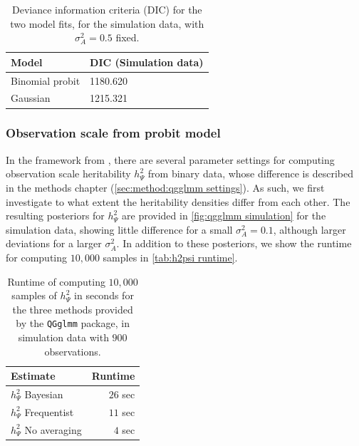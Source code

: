 \begin{table}
    \centering
    \begin{tabular}{@{}ll@{}}
    \toprule
        Model           & DIC (Simulation data) \\ \midrule
        Binomial probit & 1180.620 \\
        Gaussian        & 1215.321\\
        \bottomrule
    \end{tabular}
    \caption[DIC for simulation data]{Deviance information criteria (DIC) for the two model fits, for the simulation data, with $\sigma^2_A=0.5$ fixed.}
    \label{tab:simulation DICs}
\end{table}

\subsubsection{Observation scale from probit model}
In the framework from \textcite{de2016general}, there are several parameter settings for computing observation scale heritability $h^2_\Psi$ from binary data, whose difference is described in the methods chapter (\autoref{sec:method:qgglmm settings}). As such, we first investigate to what extent the heritability densities differ from each other. The resulting posteriors for $h^2_\Psi$ are provided in \autoref{fig:qgglmm simulation} for the simulation data, showing little difference for a small $\sigma^2_A=0.1$, although larger deviations for a larger $\sigma^2_A$. In addition to these posteriors, we show the runtime for computing $10,000$ samples in \autoref{tab:h2psi runtime}.

\begin{table}
    \centering
    \begin{tabular}{@{}lr@{}}
    \toprule
    Estimate & Runtime \\ \midrule
    $h^2_\Psi$ Bayesian & $26$ sec \\
    $h^2_\Psi$ Frequentist & $11$ sec \\
    $h^2_\Psi$ No averaging & $4$ sec \\
    \bottomrule
    \end{tabular}
    \caption[Runtime of computing $h^2_\Psi$]{Runtime of computing $10,000$ samples of $h^2_\Psi$ in seconds for the three methods provided by the \texttt{QGglmm} package, in simulation data with $900$ observations.}
    \label{tab:h2psi runtime}
\end{table}


